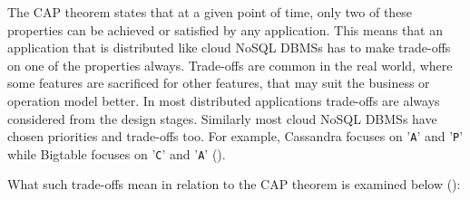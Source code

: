 The CAP theorem states that at a given point of time,   only two of these
properties can be achieved or satisfied by any application.  This means that an
application that is distributed like cloud \ac{NoSQL} \acp{DBMS} has to make
trade-offs on one of the properties always.  Trade-offs are common in the real world,   where
some features are sacrificed for other features,   that may suit the
business or operation model better.  In most distributed applications trade-offs are always
considered from the design stages.   Similarly most cloud \ac{NoSQL} \acp{DBMS} have chosen
priorities and trade-offs too.  For example,   Cassandra focuses on '\texttt{A}'
and '\texttt{P}' while Bigtable focuses on '\texttt{C}' and '\texttt{A}'
(). 

What such trade-offs mean in relation to the CAP theorem is examined below
():

